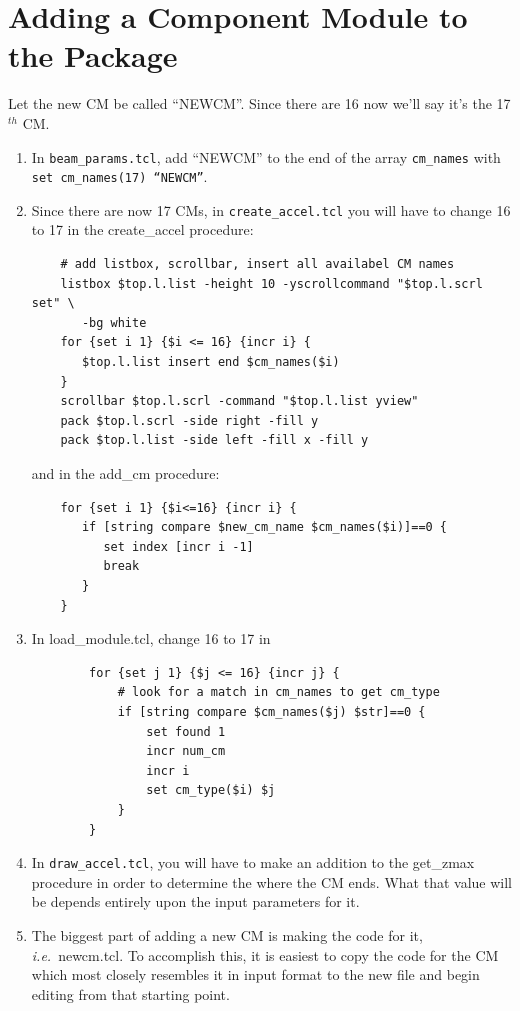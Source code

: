 \documentclass[12pt]{book}
\newcommand{\ie}{{\em i.e.}}
\begin{document}
\section{Adding a Component Module to the Package}
Let the new CM be called ``NEWCM''.  Since there are 16 now we'll say
it's the 17$^{th}$ CM.
\begin{enumerate}
\item In {\tt beam\_params.tcl}, add ``NEWCM'' to the end of the array
{\tt cm\_names} with {\tt set cm\_names(17) ``NEWCM''}.

\item Since there are now 17 CMs, in {\tt create\_accel.tcl} you will have to
change 16 to 17 in the {\sf create\_accel} procedure:
\begin{verbatim}
    # add listbox, scrollbar, insert all availabel CM names
    listbox $top.l.list -height 10 -yscrollcommand "$top.l.scrl set" \
       -bg white
    for {set i 1} {$i <= 16} {incr i} {
       $top.l.list insert end $cm_names($i)
    }
    scrollbar $top.l.scrl -command "$top.l.list yview"
    pack $top.l.scrl -side right -fill y
    pack $top.l.list -side left -fill x -fill y
\end{verbatim}
and in the {\sf add\_cm} procedure:
\begin{verbatim}
    for {set i 1} {$i<=16} {incr i} {
       if [string compare $new_cm_name $cm_names($i)]==0 {
          set index [incr i -1]
          break
       }
    }
\end{verbatim}
\item In {\sf load\_module.tcl}, change 16 to 17 in
\begin{verbatim}
        for {set j 1} {$j <= 16} {incr j} {
            # look for a match in cm_names to get cm_type
            if [string compare $cm_names($j) $str]==0 {
                set found 1
                incr num_cm
                incr i
                set cm_type($i) $j
            }
        }
\end{verbatim}
\item In {\tt draw\_accel.tcl}, you will have to make an addition to the
{\sf get\_zmax} procedure in order to determine the where the CM ends.
What that value will be depends entirely upon the input parameters for it.

\item The biggest part of adding a new CM is making the code for it,
\ie~newcm.tcl.  To accomplish this, it is easiest to copy the code for the
CM which most closely resembles it in input format to the new file and
begin editing from that starting point.
\end{enumerate}
\end{document}
